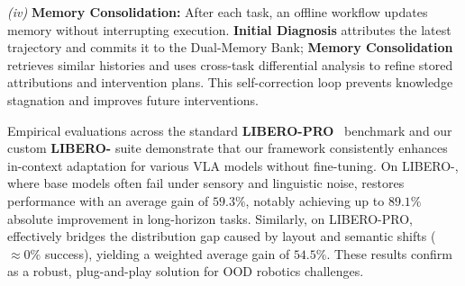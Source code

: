 \emph{(iv)} \textbf{Memory Consolidation:}
After each task, an offline workflow updates memory without interrupting execution.
\textbf{Initial Diagnosis} attributes the latest trajectory and commits it to the Dual-Memory Bank; 
\textbf{Memory Consolidation} retrieves similar histories and uses cross-task differential analysis to refine stored attributions and intervention plans.
This self-correction loop prevents knowledge stagnation and improves future interventions.

Empirical evaluations across the standard \textbf{LIBERO-PRO}~\cite{liberopro} benchmark and our custom \textbf{LIBERO-{\sys}} suite demonstrate that our framework consistently enhances in-context adaptation for various VLA models without fine-tuning. 
On LIBERO-{\sys}, where base models often fail under sensory and linguistic noise, {\sys} restores performance with an average gain of $\mathbf{59.3\%}$, notably achieving up to $89.1\%$ absolute improvement in long-horizon tasks. 
Similarly, on LIBERO-PRO\cite{liberopro}, {\sys} effectively bridges the distribution gap caused by layout and semantic shifts (${\approx}0\%$ success), yielding a weighted average gain of $\mathbf{54.5\%}$. These results confirm {\sys} as a robust, plug-and-play solution for OOD robotics challenges.


